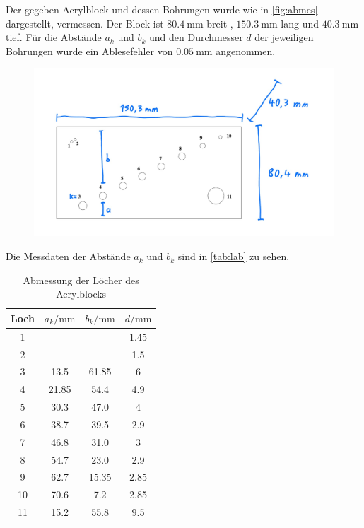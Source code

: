 Der gegeben Acrylblock und dessen Bohrungen wurde wie in \autoref{fig:abmes} dargestellt, vermessen.
Der Block ist $\SI{80.4}{\milli\meter}$ breit , $\SI{150.3}{\milli\meter}$ lang und $\SI{40.3}{\milli\meter}$ tief.
Für die Abstände $a_k$ und $b_k$ und den Durchmesser $d$ der jeweiligen Bohrungen wurde ein Ablesefehler von $\SI{0.05}{\milli\meter}$
angenommen.
\begin{figure}[H]
    \centering
    \includegraphics[width=0.9\linewidth]{content/grafik/abmessung.jpg}
	\captionsetup{width=0.765\linewidth}
    \label{fig:abmes}
\end{figure}
Die Messdaten der Abstände $a_k$ und $b_k$ sind in \autoref{tab:lab} zu sehen. 
\begin{table}[H]
    \centering
    \caption{Abmessung der Löcher des Acrylblocks}
    \label{tab:lab}
\begin{tabular}{c c c c}
    \toprule
    Loch & $a_k / \si{\milli\meter}$ & $b_k / \si{\milli\meter}$ & $d / \si{\milli\meter}$\\
    \midrule
    1 &     &       & 1.45 \\
    2 &     &       & 1.5 \\
    3 & 13.5 & 61.85 &    6  \\
    4 &21.85 &  54.4 &  4.9  \\
    5 &30.3 &  47.0 &    4  \\
    6 & 38.7 &  39.5 &  2.9  \\
    7 &46.8 &  31.0 &    3  \\
    8 &54.7 &  23.0 &  2.9  \\
    9 & 62.7 & 15.35 & 2.85  \\
    10 & 70.6 &   7.2 & 2.85  \\
    11 &15.2 &  55.8 &  9.5 \\
    \bottomrule
    \end{tabular}
\end{table}

